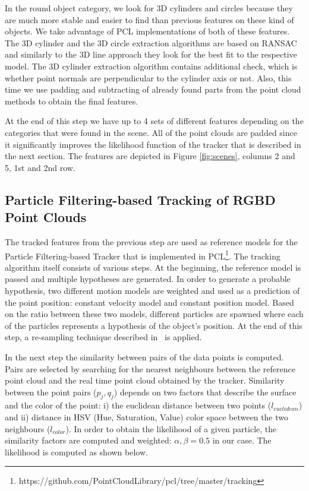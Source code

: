 In the round object category, we look for 3D cylinders and circles because they are much more stable and easier to find than previous features on these kind of objects. We take advantage of PCL implementations of both of these features. The 3D cylinder and the 3D circle extraction algorithms are based on RANSAC and similarly to the 3D line approach they look for the best fit to the respective model. The 3D cylinder extraction algorithm contains additional check, which is whether point normals are perpendicular to the cylinder axis or not. Also, this time we use padding and subtracting of already found parts from the point cloud methods to obtain the final features. 

At the end of this step we have up to 4 sets of different features depending on the categories that were found in the scene. All of the point clouds are padded since it significantly improves the likelihood function of the tracker that is described in the next section. The features are depicted in Figure \ref{fig:scenes}, columns 2 and 5, 1st and 2nd row. 




\subsection{Particle Filtering-based Tracking of RGBD Point Clouds}
\label{sec:tracking}
The tracked features from the previous step are used as reference models for the Particle Filtering-based Tracker that is implemented in PCL\footnote{https://github.com/PointCloudLibrary/pcl/tree/master/tracking}. The tracking algorithm itself consists of various steps. At the beginning, the reference model is passed and multiple hypotheses are generated. In order to generate a probable hypothesis, two different motion models are weighted and used as a prediction of the point position: constant velocity model and constant position model. Based on the ratio between these two models, different particles are spawned where each of the particles represents a hypothesis of the object's position. At the end of this step, a re-sampling technique described in~\cite{Walker} is applied. 

In the next step the similarity between pairs of the data points is computed. Pairs are selected by searching for the nearest neighbours between the reference point cloud and the real time point cloud obtained by the tracker. Similarity between the point pairs ($p_{j},q_{j}$) depends on two factors that describe the surface and the color of the point: i) the euclidean distance between two points ($l_{euclidean}$) and ii) distance in HSV (Hue, Saturation, Value) color space between the two neighbours ($l_{color}$). In order to obtain the likelihood of a given particle, the similarity factors are computed and weighted: $\alpha, \beta = 0.5$ in our case. The likelihood is computed as shown below.

